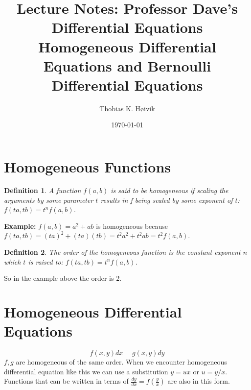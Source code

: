 \documentclass[12pt]{article}
\title{Lecture Notes: Professor Dave's Differential Equations  Homogeneous Differential Equations and Bernoulli Differential Equations}
\author{Thobias K. Høivik}
\date{\today}
\newtheorem{definition}{Definition}
\begin{document}
\maketitle
\section*{Homogeneous Functions}
\begin{definition}    
    A function \(f(a,b)\) is said to be homogeneous if 
    scaling the arguments by some parameter \(t\)
    results in f being scaled by some exponent of 
    \(t\): \(f(ta,tb) = t^nf(a,b)\). 
\end{definition}

\noindent 
\textbf{Example:}
\(f(a,b)=a^2+ab\) is homogeneous because 
\(f(ta,tb) = (ta)^2 + (ta)(tb) = t^2a^2+t^2ab = t^2f(a,b)\).
\begin{definition}
    The order of the homogeneous function is the constant exponent \(n\)
    which \(t\) is raised to: \(f(ta,tb) = t^nf(a,b)\).
\end{definition}

\noindent 
So in the example above the order is \(2\).

\section*{Homogeneous Differential Equations}
\[ 
    f(x,y)dx = g(x,y)dy
\]
\(f,g\) are homogeneous of the same order. 
When we encounter homogeneous differential equation like this 
we can use a substitution \(y = ux\) or \(u = y/x\). Functions 
that can be written in terms of \(\frac{dy}{dx} = f(\frac{y}{x})\)
are also in this form.
\end{document}
